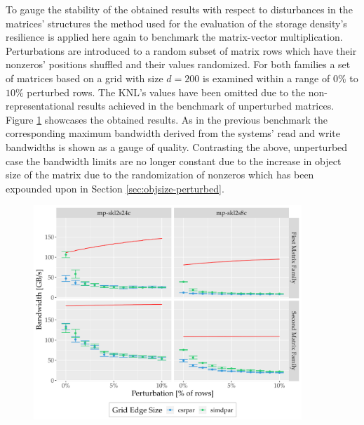     To gauge the stability of the obtained results with respect to disturbances in the matrices' structures the method
    used for the evaluation of the storage density's resilience is applied here again to benchmark the matrix-vector
    multiplication. Perturbations are introduced to a random subset of matrix rows which have their nonzeros' positions
    shuffled and their values randomized. For both families a set of matrices based on a grid with size $d=200$ is
    examined within a range of $0\%$ to $10\%$ perturbed rows. The KNL's values have been omitted due to the
    non-representational results achieved in the benchmark of unperturbed matrices. Figure
    \ref{fig:mvm-perturbed-actually-perturbed} showcases the obtained results. As in the previous benchmark the
    corresponding maximum bandwidth derived from the systems' read and write bandwidths is shown as a gauge of quality.
    Contrasting the above, unperturbed case the bandwidth limits are no longer constant due to the increase in object
    size of the matrix due to the randomization of nonzeros which has been expounded upon in Section
    \ref{sec:objsize-perturbed}. 

    \begin{figure}[H]
      \centering
      \captionsetup{width=0.9\textwidth}
      \includegraphics[width=0.9\textwidth]{assets/mvm-perturbed-actually-perturbed}
      \label{fig:mvm-perturbed-actually-perturbed}
    \end{figure}


